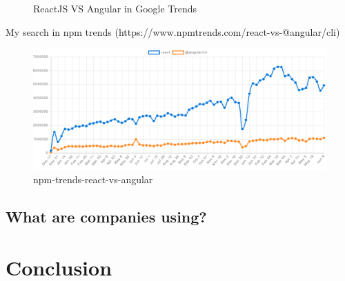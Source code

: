 \begin{figure}%
	\centering
	\qquad
	\caption{ReactJS VS Angular in Google Trends}%
	\label{fig:example}%
\end{figure}

My search in npm trends (https://www.npmtrends.com/react-vs-@angular/cli)

\begin{figure}[h!]
	\begin{center}
		\includegraphics[scale=0.3]{images/npm-trends-react-vs-angular.png}
	\end{center}
	\caption{npm-trends-react-vs-angular}
\end{figure}

\subsection{What are companies using?}

\section{Conclusion}


